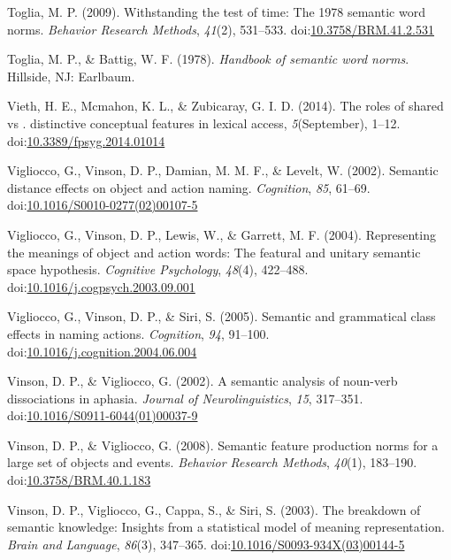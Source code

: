 \documentclass[english,,man]{apa6}
\theoremstyle{definition}
\theoremstyle{definition}
\theoremstyle{definition}
\theoremstyle{remark}
\begin{document}
\leavevmode\hypertarget{ref-Toglia2009}{}%
Toglia, M. P. (2009). Withstanding the test of time: The 1978 semantic
word norms. \emph{Behavior Research Methods}, \emph{41}(2), 531--533.
doi:\href{https://doi.org/10.3758/BRM.41.2.531}{10.3758/BRM.41.2.531}

\leavevmode\hypertarget{ref-Toglia1978}{}%
Toglia, M. P., \& Battig, W. F. (1978). \emph{Handbook of semantic word
norms}. Hillside, NJ: Earlbaum.

\leavevmode\hypertarget{ref-Vieth2014}{}%
Vieth, H. E., Mcmahon, K. L., \& Zubicaray, G. I. D. (2014). The roles
of shared vs . distinctive conceptual features in lexical access,
\emph{5}(September), 1--12.
doi:\href{https://doi.org/10.3389/fpsyg.2014.01014}{10.3389/fpsyg.2014.01014}

\leavevmode\hypertarget{ref-Vigliocco2002}{}%
Vigliocco, G., Vinson, D. P., Damian, M. M. F., \& Levelt, W. (2002).
Semantic distance effects on object and action naming. \emph{Cognition},
\emph{85}, 61--69.
doi:\href{https://doi.org/10.1016/S0010-0277(02)00107-5}{10.1016/S0010-0277(02)00107-5}

\leavevmode\hypertarget{ref-Vigliocco2004}{}%
Vigliocco, G., Vinson, D. P., Lewis, W., \& Garrett, M. F. (2004).
Representing the meanings of object and action words: The featural and
unitary semantic space hypothesis. \emph{Cognitive Psychology},
\emph{48}(4), 422--488.
doi:\href{https://doi.org/10.1016/j.cogpsych.2003.09.001}{10.1016/j.cogpsych.2003.09.001}

\leavevmode\hypertarget{ref-Vigliocco2005}{}%
Vigliocco, G., Vinson, D. P., \& Siri, S. (2005). Semantic and
grammatical class effects in naming actions. \emph{Cognition},
\emph{94}, 91--100.
doi:\href{https://doi.org/10.1016/j.cognition.2004.06.004}{10.1016/j.cognition.2004.06.004}

\leavevmode\hypertarget{ref-Vinson2002}{}%
Vinson, D. P., \& Vigliocco, G. (2002). A semantic analysis of noun-verb
dissociations in aphasia. \emph{Journal of Neurolinguistics}, \emph{15},
317--351.
doi:\href{https://doi.org/10.1016/S0911-6044(01)00037-9}{10.1016/S0911-6044(01)00037-9}

\leavevmode\hypertarget{ref-Vinson2008}{}%
Vinson, D. P., \& Vigliocco, G. (2008). Semantic feature production
norms for a large set of objects and events. \emph{Behavior Research
Methods}, \emph{40}(1), 183--190.
doi:\href{https://doi.org/10.3758/BRM.40.1.183}{10.3758/BRM.40.1.183}

\leavevmode\hypertarget{ref-Vinson2003}{}%
Vinson, D. P., Vigliocco, G., Cappa, S., \& Siri, S. (2003). The
breakdown of semantic knowledge: Insights from a statistical model of
meaning representation. \emph{Brain and Language}, \emph{86}(3),
347--365.
doi:\href{https://doi.org/10.1016/S0093-934X(03)00144-5}{10.1016/S0093-934X(03)00144-5}
\end{document}
